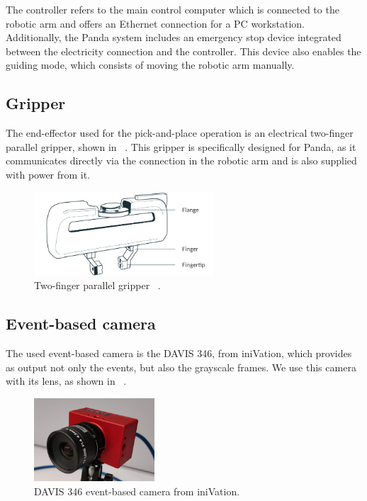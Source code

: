 The controller refers to the main control computer which is connected to the robotic arm and offers an Ethernet connection for a PC workstation. Additionally, the Panda system includes an emergency stop device integrated between the electricity connection and the controller. This device also enables the guiding mode, which consists of moving the robotic arm manually.

\subsection{Gripper}

The end-effector used for the pick-and-place operation is an electrical two-finger parallel gripper, shown in ~. This gripper is specifically designed for Panda, as it communicates directly via the connection in the robotic arm and is also supplied with power from it.

\begin{figure}[h]
    \centering
    \includegraphics[width=0.6\textwidth]{resources/images/pandagripper}
    \caption{Two-finger parallel gripper ~\cite{panda}.}\label{fig:pandagripper}
\end{figure}

\subsection{Event-based camera}

The used event-based camera is the DAVIS 346, from iniVation, which provides as output not only the events, but also the grayscale frames. We use this camera with its lens, as shown in ~.

\begin{figure}[H]
    \centering
    \includegraphics[width=0.4\textwidth]{resources/images/davis}
    \caption{DAVIS 346 event-based camera from iniVation.}\label{fig:davis}
\end{figure}

